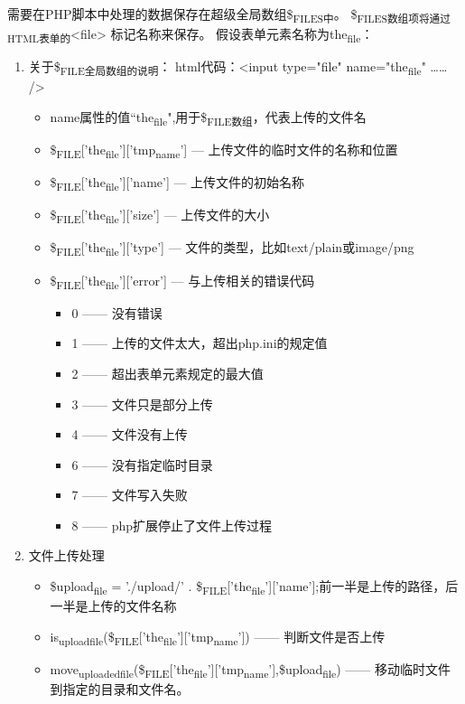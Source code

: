 \documentclass[11pt]{article}
\begin{document}
需要在PHP脚本中处理的数据保存在超级全局数组\$\textsubscript{FILES中}。 \$\textsubscript{FILES数组项将通过HTML表单的}<file> 标记名称来保存。 假设表单元素名称为the\textsubscript{file}：
\begin{enumerate}
\item 关于\$\textsubscript{FILE全局数组的说明}：
\label{sec:orgcf2efaa}
html代码：<input type="file" name="the\textsubscript{file}" …… />
\begin{itemize}
\item name属性的值“the\textsubscript{file}",用于\$\textsubscript{FILE数组}，代表上传的文件名
\item \$\textsubscript{FILE}['the\textsubscript{file}']['tmp\textsubscript{name}'] --- 上传文件的临时文件的名称和位置
\item \$\textsubscript{FILE}['the\textsubscript{file}']['name'] --- 上传文件的初始名称
\item \$\textsubscript{FILE}['the\textsubscript{file}']['size'] --- 上传文件的大小
\item \$\textsubscript{FILE}['the\textsubscript{file}']['type'] --- 文件的类型，比如text/plain或image/png
\item \$\textsubscript{FILE}['the\textsubscript{file}']['error'] --- 与上传相关的错误代码
\begin{itemize}
\item 0 —— 没有错误
\item 1 —— 上传的文件太大，超出php.ini的规定值
\item 2 —— 超出表单元素规定的最大值
\item 3 —— 文件只是部分上传
\item 4 —— 文件没有上传
\item 6 —— 没有指定临时目录
\item 7 —— 文件写入失败
\item 8 —— php扩展停止了文件上传过程
\end{itemize}
\end{itemize}
\item 文件上传处理
\label{sec:org0dbec36}
\begin{itemize}
\item \$upload\textsubscript{file} = './upload/' . \$\textsubscript{FILE}['the\textsubscript{file}']['name'];前一半是上传的路径，后一半是上传的文件名称
\item is\textsubscript{upload}\textsubscript{file}(\$\textsubscript{FILE}['the\textsubscript{file}']['tmp\textsubscript{name}']) —— 判断文件是否上传
\item move\textsubscript{uploaded}\textsubscript{file}(\$\textsubscript{FILE}['the\textsubscript{file}']['tmp\textsubscript{name}'],\$upload\textsubscript{file}) —— 移动临时文件到指定的目录和文件名。
\end{itemize}
\end{enumerate}
\end{document}
